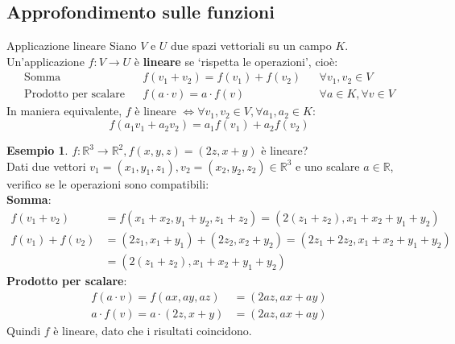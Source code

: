\documentclass[a4paper]{article}
\theoremstyle{definition}
\newtheorem*{es}{Esempio}
\begin{document}
\subsection{Approfondimento sulle funzioni}
\begin{deff}{Applicazione lineare}{}
	Siano $V$ e $U$ due spazi vettoriali su un campo $K$.
	Un'applicazione $f: V \rightarrow U$ è \textbf{lineare} se \enquote*{rispetta le operazioni}, cioè:
	\begin{align*}
		\text{Somma}                &  & f(v_1 + v_2) = f(v_1) + f(v_2) &  & \forall v_1, v_2 \in V           \\
		\text{Prodotto per scalare} &  & f(a \cdot v) = a \cdot f(v)    &  & \forall a \in K, \forall v \in V
	\end{align*}
	In maniera equivalente, $f$ è lineare $\Leftrightarrow \forall v_1, v_2 \in V, \forall a_1, a_2 \in K$:
	\begin{equation*}
		f(a_1v_1 + a_2v_2) = a_1f(v_1) + a_2f(v_2)
	\end{equation*}
\end{deff}
\begin{es}
	$f: \mathbb{R}^3 \rightarrow \mathbb{R}^2, f(x, y, z) = (2z, x + y)$ è lineare? \\
	Dati due vettori $v_1 = (x_1, y_1, z_1), v_2 = (x_2, y_2, z_2) \in \mathbb{R}^3$ e uno scalare $a \in \mathbb{R}$,
	verifico se le operazioni sono compatibili: \\
	\textbf{Somma}:
	\begin{align*}
		f(v_1 + v_2)    & = f(x_1 + x_2, y_1 + y_2, z_1 + z_2) = (2(z_1 + z_2), x_1 + x_2 + y_1 + y_2)   \\
		f(v_1) + f(v_2) & = (2z_1, x_1 + y_1) + (2z_2, x_2 + y_2) = (2z_1 + 2z_2, x_1 + x_2 + y_1 + y_2) \\
		                & = (2(z_1 + z_2), x_1 + x_2 + y_1 + y_2)
	\end{align*}
	\textbf{Prodotto per scalare}:
	\begin{align*}
		f(a \cdot v) = f(ax, ay, az)       & = (2az, ax + ay) \\
		a \cdot f(v) = a \cdot (2z, x + y) & = (2az, ax + ay)
	\end{align*}
	Quindi $f$ è lineare, dato che i risultati coincidono.
\end{es}
\end{document}
